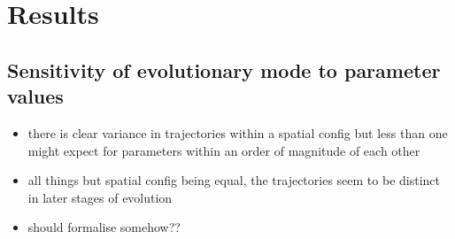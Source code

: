 \section{Results}

\subsection{Sensitivity of evolutionary mode to parameter values}

\begin{itemize}
    \item there is clear variance in trajectories within a spatial config but
        less than one might expect for parameters within an order of magnitude
        of each other
    \item all things but spatial config being equal, the trajectories seem to be
        distinct in later stages of evolution
    \item should formalise somehow??
\end{itemize}

